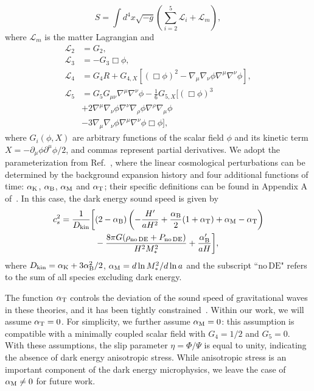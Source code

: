 \documentclass[%
reprint,
superscriptaddress,
preprint numbers,
nofootinbib,
amsmath,amssymb,
aps,
prd
]{revtex4-2}
\begin{document}
\begin{equation}
    S = \int d^4x\sqrt{-g}\left( \sum_{i=2}^5 \mathcal{L}_i + \mathcal{L}_m \right),
\end{equation}
where $\mathcal{L}_m$ is the matter Lagrangian and
\begin{subequations}
    \begin{align}
        \mathcal{L}_2 &= G_2,\\
        \mathcal{L}_3 &= -G_3\Box\phi,\\
        \mathcal{L}_4 &= G_4R + G_{4, X}[(\Box\phi)^2 - \nabla_\mu \nabla_\nu\phi\nabla^\mu \nabla^\nu\phi],\\
        \mathcal{L}_5 &= G_5G_{\mu\nu}\nabla^\mu \nabla^\nu\phi - \frac{1}{6}G_{5,X}[(\Box\phi)^3 \nonumber\\
        &+ 2\nabla^\mu\nabla_\nu\phi \nabla^\nu\nabla_\rho\phi\nabla^\rho\nabla_\mu\phi\nonumber\\
        &- 3\nabla_\mu \nabla_\nu\phi\nabla^\mu \nabla^\nu\phi\Box\phi],
    \end{align}
\end{subequations}
where $G_i(\phi, X)$ are arbitrary functions of the scalar field $\phi$ and its kinetic term $X = -\partial_\mu\phi\partial^\mu\phi/2$, and commas represent partial derivatives. We adopt the parameterization from Ref.~\cite{bellini_sawicky}, where the linear cosmological perturbations can be determined by the background expansion history and four additional functions of time: $\alpha_{\rm K}$, $\alpha_{\rm B}$, $\alpha_{\rm M}$ and $\alpha_{\rm T}$; their specific definitions can be found in Appendix A of~\cite{bellini_sawicky}. In this case, the dark energy sound speed is given by~\cite{bellini_sawicky, kazuya_mg_phantom, kazuya_theoretical_priors_mg, mg_sims, growth_mg}
\begin{align}\label{eq:cs2_mg}
    c_s^2 =  \frac{1}{D_\mathrm{kin}} \biggr[ &(2 - \alpha_{\rm B})\left(-\frac{H'}{aH^2} + \frac{\alpha_{\rm B}}{2}(1 + \alpha_{\rm T}) + \alpha_{\rm M} - \alpha_{\rm T}\right) \nonumber\\ &- \frac{8\pi G(\rho_\mathrm{no \, DE} + P_\mathrm{no \, DE})}{H^2M_*^2} + \frac{\alpha_{\rm B}'}{aH}\biggr],
\end{align}
where $D_\mathrm{kin} = \alpha_{\rm K} + 3\alpha_{\rm B}^2/2$, $\alpha_{\rm M} = d\ln M_*^2/d\ln a$ and the subscript ``$\mathrm{no \, DE}$" refers to the sum of all species excluding dark energy.

The function $\alpha_{\rm T}$ controls the deviation of the sound speed of gravitational waves in these theories, and it has been tightly constrained~\cite{alpha_T_constraints}. Within our work, we will assume $\alpha_{\rm T} = 0$. For simplicity, we further assume $\alpha_{\rm M} = 0$: this assumption is compatible with a minimally coupled scalar field with $G_4 = 1/2$ and $G_5 = 0$. With these assumptions, the slip parameter $\eta = \Phi/\Psi$ is equal to unity, indicating the absence of dark energy anisotropic stress. While anisotropic stress is an important component of the dark energy microphysics, we leave the case of $\alpha_{\rm M} \neq 0$ for future work.
\end{document}
